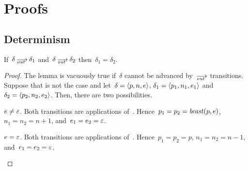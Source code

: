 \clearpage
\appendix
\section{Proofs}
\label{sec.proofs}

\subsection*{Determinism}


\begin{lemma}
  \label{lem.det-out}
  If~$\delta\out\delta_1$ and~$\delta\out\delta_2$ then~$\delta_1=\delta_2$.
\end{lemma}
\begin{proof}
  The lemma is vacuously true if~$\delta$ cannot be advanced by~$\out$
  transitions.  Suppose that is not the case and let~$\delta=\<p,n,e>$,
  $\delta_1=\<p_1,n_1,e_1>$ and~$\delta_2=\<p_2,n_2,e_2>$.  Then, there are
  two possibilities.
  \begin{case}
    $e\ne\varepsilon$.  Both transitions are applications of~.
    Hence~$p_1=p_2=\operatorname{\mathit{bcast}}(p,e)$, $n_1=n_2=n+1$, and~$e_1=e_2=\varepsilon$.
  \end{case}
  \begin{case}
    $e=\varepsilon$.  Both transitions are applications of~.
    Hence~$p_1=p_2=p$, $n_1=n_2=n-1$, and~$e_1=e_2=\varepsilon$.\qedhere
  \end{case}
\end{proof}


